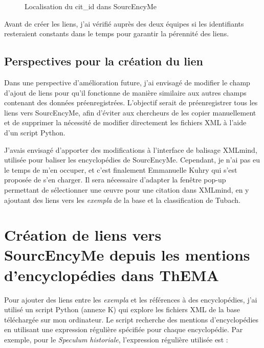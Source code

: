  \begin{figure}[H]
	\centering
	\caption{Localisation du cit\_id dans SourcEncyMe}
\end{figure}

Avant de créer les liens, j'ai vérifié auprès des deux équipes si les identifiants resteraient constants dans le temps pour garantir la pérennité des liens.


\subsection{Perspectives pour la création du lien}
Dans une perspective d'amélioration future, j'ai envisagé de modifier le champ d'ajout de liens pour qu'il fonctionne de manière similaire aux autres champs contenant des données préenregistrées. L'objectif serait de préenregistrer tous les liens vers SourcEncyMe, afin d'éviter aux chercheurs de les copier manuellement et de supprimer la nécessité de modifier directement les fichiers XML à l'aide d'un script Python.

J'avais envisagé d'apporter des modifications à l'interface de balisage XMLmind, utilisée pour baliser les encyclopédies de SourcEncyMe. Cependant, je n'ai pas eu le temps de m'en occuper, et c'est finalement Emmanuelle Kuhry qui s'est proposée de s'en charger. Il sera nécessaire d'adapter la fenêtre pop-up permettant de sélectionner une œuvre pour une citation dans XMLmind, en y ajoutant des liens vers les \textit{exempla} de la base et la classification de Tubach.


\section{Création de liens vers SourcEncyMe depuis les mentions d'encyclopédies dans ThEMA}
Pour ajouter des liens entre les \textit{exempla} et les références à des encyclopédies, j'ai utilisé un script Python (annexe K) qui explore les fichiers XML de la base téléchargée sur mon ordinateur. Le script recherche des mentions d'encyclopédies en utilisant une expression régulière spécifiée pour chaque encyclopédie. Par exemple, pour le \textit{Speculum historiale}, l'expression régulière utilisée est : \\

